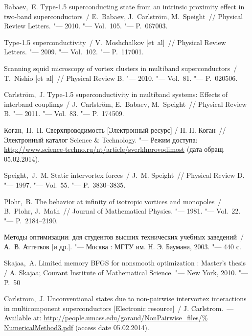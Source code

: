 \begin{thebibliography}{10}
     Babaev,~E. Type-1.5 superconducting state from an
        intrinsic proximity effect in two-band superconductors~/
        E.~Babaev, J.~Carlstr\"om, M.~Speight~// Physical Review Letters. "---
        2010. "--- Vol.~105. "--- P.~067003.

     Type-1.5 superconductivity~/ V.~Moshchalkov [et~al]~//
        Physical Review Letters. "--- 2009. "--- Vol.~102. "--- P.~117001.

     Scanning squid microscopy of vortex clusters in multiband
        superconductors~/ T.~Nishio [et~al]~// Physical Review B. "---
        2010. "--- Vol.~81. "--- P.~020506.

     Carlstr\"om,~J. Type-1.5 superconductivity in multiband
        systems: Effects of interband couplings~/ J.~Carlstr\"om, E.~Babaev,
        M.~Speight~// Physical Review B. "--- 2011. "--- Vol.~83. "---
        P.~174509.

     Коган,~Н.~Н. Сверхпроводимость
        [Электронный ресурс] / Н. Н. Коган~// Электронный каталог Science \& Technology. "---
        Режим доступа:
        \url{http://www.science-techno.ru/nt/article/sverkhprovodimost}
        (дата обращ. 05.02.2014).

     Speight,~J.~M. Static intervortex forces~/
        J.~M. Speight~// Physical Review D. "--- 1997. "--- Vol.~55. "---
        P.~3830--3835.

     Plohr,~B. The behavior at infinity of isotropic vortices
        and monopoles~/ B.~Plohr, J.~Math~//
        Journal of Mathematical Physics. "--- 1981. "--- Vol.~22. "---
        P.~2184--2190.

     Методы оптимизации: для студентов высших технических
        учебных заведений~/ А.~В. Аттетков [и др.]. "---
        Москва : МГТУ им. Н. Э. Баумана, 2003. "--- 440 с.

     Skajaa,~A. Limited memory BFGS for nonsmooth
        optimization : Master's thesis / A. Skajaa; Courant Institute of
        Mathematical Science. "--- New York, 2010. "--- P.~50

     Carlstrom,~J. Unconventional states due to
        non-pairwise intervortex interactions in multicomponent
        superconductors [Electronic resource]~/ J. Carlstrom.~--- Available at:
        \url{http://people.umass.edu/garaud/NonPairwise_files/%
        NumericalMethod3.pdf} (access date 05.02.2014).
\end{thebibliography}

\newpage
